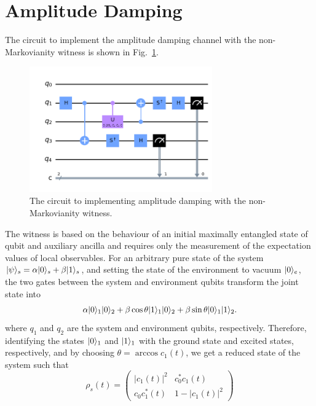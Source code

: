 \documentclass[12pt]{article}
\DeclarePairedDelimiter{\ket}{\lvert}{\rangle}
\begin{document}
  \section{Amplitude Damping}
  The circuit to implement the amplitude damping channel with the non-Markovianity witness is shown in Fig.~\ref{fig:amplitude_damping_circuit}.
  \begin{figure}
    \centering
    \includegraphics[width=0.7\textwidth]{images/amplitude_damping_yy_circuit.png}
    \caption{The circuit to implementing amplitude damping with the non-Markovianity witness.%
      \label{fig:amplitude_damping_circuit}}
  \end{figure}
  The witness is based on the behaviour of an initial maximally entangled state of qubit and auxiliary ancilla and requires only the measurement of the expectation values of local observables. For an arbitrary pure state of the system \( \ket{\psi}_{s} = \alpha \ket{0}_{s} + \beta \ket{1}_{s} \), and setting the state of the environment to vacuum \( \ket{0}_{e} \), the two gates between the system and environment qubits transform the joint state into
  \begin{equation}
    \alpha \ket{0}_{1} \ket{0}_{2} + \beta \cos \theta \ket{1}_{1} \ket{0}_{2}
    + \beta \sin \theta \ket{0}_{1} \ket{1}_{2}.
  \end{equation}
  where \( q_{1} \) and \( q_{2} \) are the system and environment qubits, respectively. Therefore, identifying the states \( \ket{0}_{1} \) and \( \ket{1}_{1} \) with the ground state and excited states, respectively, and by choosing \( \theta = \arccos c_{1}(t) \), we get a reduced state of the system such that
  \begin{equation}
    \rho_{s}(t)
      = \begin{pmatrix}
          \lvert c_{1}(t) \rvert^{2} & c_{0}^{*} c_{1}(t)             \\
          c_{0} c_{1}^{*}(t)         & 1 - \lvert c_{1}(t) \rvert^{2}
        \end{pmatrix}
  \end{equation}
\end{document}

